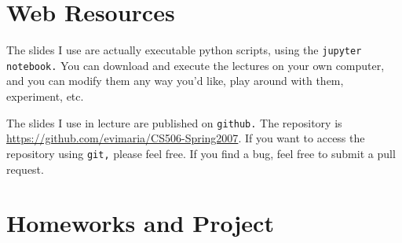 \documentclass[11pt]{article}
\begin{document}
\section*{Web Resources} 

The slides I use are actually executable python scripts, using the
\texttt{jupyter notebook.}   You can
download and execute the lectures on your own computer, and you can
modify them any way you'd like, play around with them, experiment, etc.

The slides I use in lecture are published on \texttt{github.}   The
repository is
\url{https://github.com/evimaria/CS506-Spring2007}.  If you want
to access the repository using \texttt{git,} please feel free.   If you
find a bug, feel free to submit a pull request.
 
\section*{Homeworks and Project}
\end{document}
